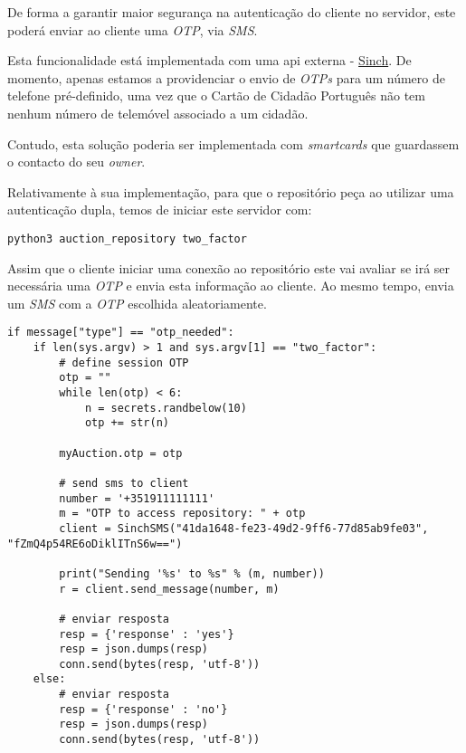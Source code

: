 \documentclass[12pt]{article}
\begin{document}
\par De forma a garantir maior segurança na autenticação do cliente no servidor, este poderá enviar ao cliente uma \textit{OTP}, via \textit{SMS}.

\par Esta funcionalidade está implementada com uma api externa - \href{https://portal.sinch.com}{Sinch}. 
De momento, apenas estamos a providenciar o envio de \textit{OTPs} para um número de telefone pré-definido, uma vez que o Cartão de Cidadão Português não tem nenhum número de telemóvel associado a um cidadão.

\par Contudo, esta solução poderia ser implementada com \textit{smartcards} que guardassem o contacto do seu \textit{owner}.

\par Relativamente à sua implementação, para que o repositório peça ao utilizar uma autenticação dupla, temos de iniciar este servidor com:

\vspace{5mm} %

\begin{lstlisting}
python3 auction_repository two_factor
\end{lstlisting}

\par Assim que o cliente iniciar uma conexão ao repositório este vai avaliar se irá ser necessária uma \textit{OTP} e envia esta informação ao cliente. Ao mesmo tempo, envia um \textit{SMS} com a \textit{OTP} escolhida aleatoriamente.

\vspace{5mm} %

\begin{lstlisting}[caption={Verificação e Envio da \textit{OTP} via \textit{SMS} },captionpos=b]
if message["type"] == "otp_needed":
    if len(sys.argv) > 1 and sys.argv[1] == "two_factor":
        # define session OTP
        otp = ""
        while len(otp) < 6:
            n = secrets.randbelow(10)
            otp += str(n)
        
        myAuction.otp = otp

        # send sms to client
        number = '+351911111111'
        m = "OTP to access repository: " + otp
        client = SinchSMS("41da1648-fe23-49d2-9ff6-77d85ab9fe03", "fZmQ4p54RE6oDiklITnS6w==")

        print("Sending '%s' to %s" % (m, number))
        r = client.send_message(number, m)  

        # enviar resposta 
        resp = {'response' : 'yes'}
        resp = json.dumps(resp)
        conn.send(bytes(resp, 'utf-8'))
    else:
        # enviar resposta 
        resp = {'response' : 'no'}
        resp = json.dumps(resp)
        conn.send(bytes(resp, 'utf-8'))
\end{lstlisting}
\end{document}
